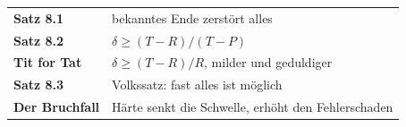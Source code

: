 \begin{merksatz}
\begin{center}
\renewcommand{\arraystretch}{1.5}
\begin{tabular}{@{}P{3.0cm}P{5.6cm}@{}}
\toprule
\textbf{Satz 8.1} & bekanntes Ende zerstört alles\\
\textbf{Satz 8.2} & $\delta \ge (T-R)/(T-P)$\\
\textbf{Tit for Tat} & $\delta \ge (T-R)/R$, milder und geduldiger\\
\textbf{Satz 8.3} & Volkssatz: fast alles ist möglich\\
\textbf{Der Bruchfall} & Härte senkt die Schwelle, erhöht den Fehlerschaden\\
\bottomrule
\end{tabular}
\end{center}

\begin{center}
\begin{minipage}{0.88\textwidth}
\end{minipage}
\end{center}
\end{merksatz}

